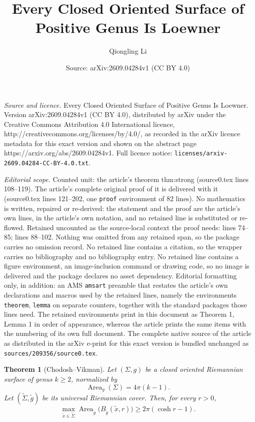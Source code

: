 \documentclass[10pt,a4paper]{amsart}
\title{Every Closed Oriented Surface of Positive Genus Is Loewner}
\author{Qiongling Li}
\date{Source: arXiv:2609.04284v1 (CC BY 4.0)}
\newtheorem{theorem}{Theorem}
\DeclareMathOperator{\Area}{Area}
\begin{document}
\maketitle

\noindent\emph{Source and licence.} Every Closed Oriented Surface of Positive Genus Is Loewner. Version arXiv:2609.04284v1 (CC BY 4.0), distributed by arXiv under the Creative Commons Attribution 4.0 International licence, http://creativecommons.org/licenses/by/4.0/, as recorded in the arXiv licence metadata for this exact version and shown on the abstract page https://arxiv.org/abs/2609.04284v1. Full licence notice: \texttt{licenses/arxiv-2609.04284-CC-BY-4.0.txt}.\par\smallskip

\noindent\textit{Editorial scope.} Counted unit: the article's theorem thm:strong (source0.tex lines 108--119). The article's complete original proof of it is delivered with it (source0.tex lines 121--202, one \texttt{proof} environment of 82 lines). No mathematics is written, repaired or re-derived: the statement and the proof are the article's own lines, in the article's own notation, and no retained line is substituted or re-flowed.  Retained uncounted as the source-local context the proof needs: lines 74--85; lines 88--102.  Nothing was omitted from any retained span, so the package carries no omission record.  No retained line contains a citation, so the wrapper carries no bibliography and no bibliography entry.  No retained line contains a figure environment, an image-inclusion command or drawing code, so no image is delivered and the package declares no asset dependency.  Editorial formatting only, in addition: an AMS \texttt{amsart} preamble that restates the article's own declarations and macros used by the retained lines, namely the environments \texttt{theorem}, \texttt{lemma} on separate counters, together with the standard packages those lines need.  The retained environments print in this document as Theorem 1, Lemma 1 in order of appearance, whereas the article prints the same items with the numbering of its own full document.  The complete native source of the article as distributed in the arXiv e-print for this exact version is bundled unchanged as \texttt{sources/209356/source0.tex}.
\begin{theorem}[Chodosh--Vikman]\label{thm:CV}
Let $(\Sigma,g)$ be a closed oriented Riemannian surface of genus $k\geq 2$, normalized by
\[
  \Area_g(\Sigma)=4\pi(k-1).
\]
Let $(\widetilde\Sigma,\widetilde g)$ be its universal Riemannian cover. Then, for every $r>0$,
\[
  \max_{\widetilde x\in\widetilde\Sigma}
  \Area_{\widetilde g}\bigl(B_{\widetilde g}(\widetilde x,r)\bigr)
  \geq 2\pi(\cosh r-1).
\]
\end{theorem}
\end{document}
